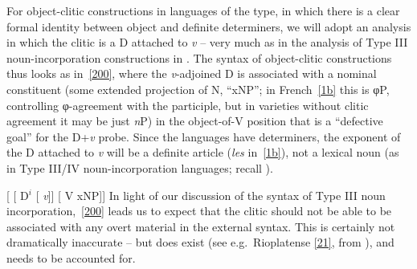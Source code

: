 \documentclass[output=paper]{langsci/langscibook}
\begin{document}
\begin{refcontext}
For object-clitic constructions in languages of the  type, in which
there is a clear formal identity between object  and definite
determiners, we will adopt an analysis in which the clitic is a D attached to
\emph{v} -- very much as in the analysis of Type III noun-incorporation
constructions in . The syntax of object-clitic constructions
thus looks as in~\eqref{200}, where the \emph{v}-adjoined D is associated with a
nominal constituent (some extended projection of N, \enquote{xNP}; in
French~\eqref{1b} this is φ{}P, controlling φ{}-agreement with the
participle, but in  varieties without clitic agreement it may be just
\emph{n}P) in the object-of-V position that is a \enquote{defective goal} for
the D+\emph{v} probe. Since the  languages have determiners, the
exponent of the D attached to \emph{v} will be a definite article (\emph{les}
in~\ref{1b}), not a lexical noun (as in Type III/IV noun-incorporation
languages; recall ).

\ea  {}[ [ D$^i$ [ \hspace{-.7ex}\emph{v}\tss{\{[+V], \Acc{}, \ldots{}\}}]] [ V xNP]] \label{200}
\z
In light of our discussion of the syntax of Type III noun
incorporation,~\eqref{200} leads us to expect that the clitic should not be able
to be associated with any overt material in the external syntax. This is
certainly not dramatically inaccurate -- but  does exist (see
e.g.\ Rioplatense  \eqref{21}, from \citealt[32]{jaeggli86}), and needs to
be accounted for.


\end{refcontext}
\end{document}
